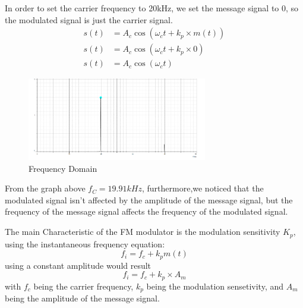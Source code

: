 \documentclass[12pt]{article}
\begin{document}
In order to set the carrier frequency to 20kHz, we set the message signal to 0, so the modulated signal is just the carrier signal.
\begin{equation}
    \begin{aligned}
        s(t) &= A_c \cos({\omega}_c t + k_p\times m(t)) \\
        s(t) &= A_c \cos({\omega}_c t + k_p\times 0)\\
        s(t) &= A_c \cos({\omega}_c t)
    \end{aligned}
\end{equation}
\begin{figure}[H]
    \centering
    \includegraphics[width=0.7\textwidth]{assets/frequency_domain.png}
    \caption{Frequency Domain}
\end{figure}
From the graph above $f_C = 19.91kHz$, furthermore,we noticed that the modulated signal isn't affected by the amplitude of the message signal, but the frequency of the message signal affects the frequency of the modulated signal.

The main Characteristic of the FM modulator is the modulation sensitivity $K_p$, using the instantaneous frequency equation:
\begin{equation}
    f_i = f_c + k_p m(t)
\end{equation}
using a constant amplitude would result
\begin{equation}
    f_i = f_c + k_p \times A_m
\end{equation}
with $f_c$ being the carrier frequency, $k_p$ being the modulation sensetivity, and $A_m$ being the amplitude of the message signal. 
\end{document}
